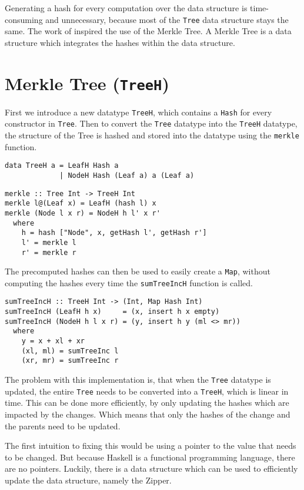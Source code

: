 Generating a hash for every computation over the data structure is time-consuming and unnecessary, because most of the \texttt{Tree} data structure stays the same. The work of \citeauthor{miraldo2019efficient}\cite{miraldo2019efficient} inspired the use of the Merkle Tree. A Merkle Tree is a data structure which integrates the hashes within the data structure.

\section{Merkle Tree (\texttt{TreeH})}
First we introduce a new datatype \texttt{TreeH}, which contains a \texttt{Hash} for every constructor in \texttt{Tree}. Then to convert the \texttt{Tree} datatype into the \texttt{TreeH} datatype, the structure of the Tree is hashed and stored into the datatype using the \texttt{merkle} function.

\begin{verbatim}
data TreeH a = LeafH Hash a
             | NodeH Hash (Leaf a) a (Leaf a)
\end{verbatim}

\begin{verbatim}
merkle :: Tree Int -> TreeH Int
merkle l@(Leaf x) = LeafH (hash l) x
merkle (Node l x r) = NodeH h l' x r'
  where
    h = hash ["Node", x, getHash l', getHash r']
    l' = merkle l
    r' = merkle r
\end{verbatim}

The precomputed hashes can then be used to easily create a \texttt{Map}, without computing the hashes every time the \texttt{sumTreeIncH} function is called.

\begin{verbatim}
sumTreeIncH :: TreeH Int -> (Int, Map Hash Int)
sumTreeIncH (LeafH h x)     = (x, insert h x empty)
sumTreeIncH (NodeH h l x r) = (y, insert h y (ml <> mr))
  where
    y = x + xl + xr
    (xl, ml) = sumTreeInc l
    (xr, mr) = sumTreeInc r
\end{verbatim}

The problem with this implementation is, that when the \texttt{Tree} datatype is updated, the entire \texttt{Tree} needs to be converted into a \texttt{TreeH}, which is linear in time. This can be done more efficiently, by only updating the hashes which are impacted by the changes. Which means that only the hashes of the change and the parents need to be updated. 

The first intuition to fixing this would be using a pointer to the value that needs to be changed. But because Haskell is a functional programming language, there are no pointers. Luckily, there is a data structure which can be used to efficiently update the data structure, namely the Zipper\cite{huet1997zipper}.

